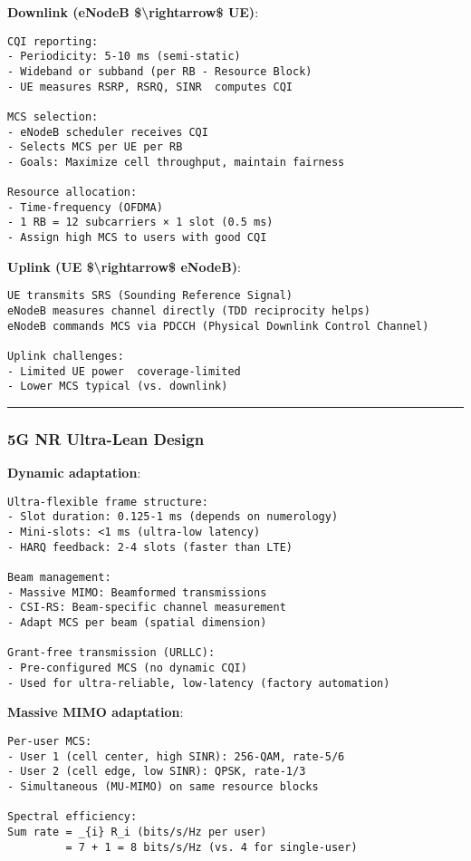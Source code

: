 \textbf{Downlink (eNodeB \$\textbackslash rightarrow\$ UE)}:

\begin{verbatim}
CQI reporting:
- Periodicity: 5-10 ms (semi-static)
- Wideband or subband (per RB - Resource Block)
- UE measures RSRP, RSRQ, SINR  computes CQI

MCS selection:
- eNodeB scheduler receives CQI
- Selects MCS per UE per RB
- Goals: Maximize cell throughput, maintain fairness

Resource allocation:
- Time-frequency (OFDMA)
- 1 RB = 12 subcarriers × 1 slot (0.5 ms)
- Assign high MCS to users with good CQI
\end{verbatim}

\textbf{Uplink (UE \$\textbackslash rightarrow\$ eNodeB)}:

\begin{verbatim}
UE transmits SRS (Sounding Reference Signal)
eNodeB measures channel directly (TDD reciprocity helps)
eNodeB commands MCS via PDCCH (Physical Downlink Control Channel)

Uplink challenges:
- Limited UE power  coverage-limited
- Lower MCS typical (vs. downlink)
\end{verbatim}

\begin{center}\rule{0.5\linewidth}{0.5pt}\end{center}

\subsubsection{5G NR Ultra-Lean Design}\label{g-nr-ultra-lean-design}

\textbf{Dynamic adaptation}:

\begin{verbatim}
Ultra-flexible frame structure:
- Slot duration: 0.125-1 ms (depends on numerology)
- Mini-slots: <1 ms (ultra-low latency)
- HARQ feedback: 2-4 slots (faster than LTE)

Beam management:
- Massive MIMO: Beamformed transmissions
- CSI-RS: Beam-specific channel measurement
- Adapt MCS per beam (spatial dimension)

Grant-free transmission (URLLC):
- Pre-configured MCS (no dynamic CQI)
- Used for ultra-reliable, low-latency (factory automation)
\end{verbatim}

\textbf{Massive MIMO adaptation}:

\begin{verbatim}
Per-user MCS:
- User 1 (cell center, high SINR): 256-QAM, rate-5/6
- User 2 (cell edge, low SINR): QPSK, rate-1/3
- Simultaneous (MU-MIMO) on same resource blocks

Spectral efficiency:
Sum rate = _{i} R_i (bits/s/Hz per user)
         = 7 + 1 = 8 bits/s/Hz (vs. 4 for single-user)
\end{verbatim}

